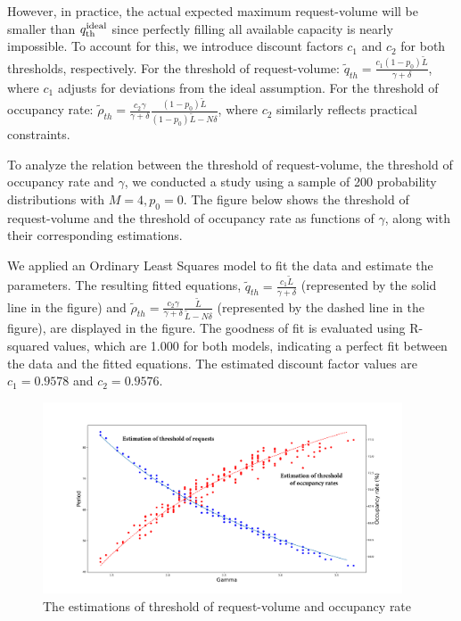 However, in practice, the actual expected maximum request-volume will be smaller than $q_{\textup{th}}^{\textup{ideal}}$ since perfectly filling all available capacity is nearly impossible. To account for this, we introduce discount factors $c_1$ and $c_2$ for both thresholds, respectively. For the threshold of request-volume:
$\tilde{q}_{th} =  \frac{c_1 (1-p_0) \tilde{L}}{\gamma + \delta}$, where $c_1$ adjusts for deviations from the ideal assumption.
For the threshold of occupancy rate:
$\tilde{\rho}_{th} = \frac{c_2 \gamma}{\gamma +\delta} \frac{(1-p_0) \tilde{L}}{(1-p_0) \tilde{L}-N \delta}$, where $c_2$ similarly reflects practical constraints.

To analyze the relation between the threshold of request-volume, the threshold of occupancy rate and $\gamma$, we conducted a study using a sample of 200 probability distributions with $M=4, p_0=0$. The figure below shows the threshold of request-volume and the threshold of occupancy rate as functions of $\gamma$, along with their corresponding estimations.

We applied an Ordinary Least Squares model to fit the data and estimate the parameters. The resulting fitted equations, $\tilde{q}_{th} = \frac{c_1 \tilde{L}}{\gamma + \delta}$ (represented by the solid line in the figure) and $\tilde{\rho}_{th} = \frac{c_2 \gamma}{\gamma + \delta} \frac{\tilde{L}}{\tilde{L}-N \delta}$ (represented by the dashed line in the figure), are displayed in the figure. The goodness of fit is evaluated using R-squared values, which are 1.000 for both models, indicating a perfect fit between the data and the fitted equations. The estimated discount factor values are $c_1 = 0.9578$ and $c_2 = 0.9576$.

\begin{figure}[ht]
  \caption{The estimations of threshold of request-volume and occupancy rate}
  \centering
    \includegraphics[width=0.95\textwidth]{./Figures/200_random.pdf}
\end{figure}

